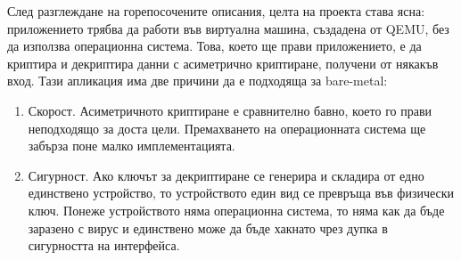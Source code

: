 След разглеждане на горепосочените описания, целта на проекта става ясна: приложението трябва да работи във виртуална машина, създадена от QEMU, без да използва операционна система. Това, което ще прави приложението, е да криптира и декриптира данни с асиметрично криптиране, получени от някакъв вход. Тази апликация има две причини да е подходяща за bare-metal:
\begin{enumerate}
  \item Скорост. Асиметричното криптиране е сравнително бавно, което го прави неподходящо за доста цели. Премахването на операционната система ще забърза поне малко имплементацията.
  \item Сигурност. Ако ключът за декриптиране се генерира и складира от едно единствено устройство, то устройството един вид се превръща във физически ключ. Понеже устройството няма операционна система, то няма как да бъде заразено с вирус и единствено може да бъде хакнато чрез дупка в сигурността на интерфейса.
\end{enumerate}



